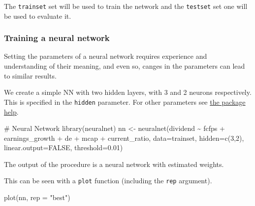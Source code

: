 \documentclass[
  letterpaper,
  DIV=11,
  numbers=noendperiod,
  oneside]{scrartcl}
\newenvironment{Shaded}{\begin{snugshade}}{\end{snugshade}}
\newcommand{\AttributeTok}[1]{\textcolor[rgb]{0.40,0.45,0.13}{#1}}
\newcommand{\CommentTok}[1]{\textcolor[rgb]{0.37,0.37,0.37}{#1}}
\newcommand{\ConstantTok}[1]{\textcolor[rgb]{0.56,0.35,0.01}{#1}}
\newcommand{\DecValTok}[1]{\textcolor[rgb]{0.68,0.00,0.00}{#1}}
\newcommand{\FloatTok}[1]{\textcolor[rgb]{0.68,0.00,0.00}{#1}}
\newcommand{\FunctionTok}[1]{\textcolor[rgb]{0.28,0.35,0.67}{#1}}
\newcommand{\NormalTok}[1]{\textcolor[rgb]{0.00,0.23,0.31}{#1}}
\newcommand{\OtherTok}[1]{\textcolor[rgb]{0.00,0.23,0.31}{#1}}
\newcommand{\SpecialCharTok}[1]{\textcolor[rgb]{0.37,0.37,0.37}{#1}}
\newcommand{\StringTok}[1]{\textcolor[rgb]{0.13,0.47,0.30}{#1}}
\begin{document}
The \texttt{trainset} set will be used to train the network and the
\texttt{testset} set one will be used to evaluate it.

\hypertarget{training-a-neural-network}{%
\subsubsection{Training a neural
network}\label{training-a-neural-network}}

Setting the parameters of a neural network requires experience and
understanding of their meaning, and even so, canges in the parameters
can lead to similar results.

We create a simple NN with two hidden layers, with 3 and 2 neurons
respectively. This is specified in the \texttt{hidden} parameter. For
other parameters see
\href{https://www.rdocumentation.org/packages/neuralnet/versions/1.44.2/topics/neuralnet}{the
package help}.

\begin{Shaded}
\begin{Highlighting}[]
\CommentTok{\# Neural Network}
\FunctionTok{library}\NormalTok{(neuralnet)}
\NormalTok{nn }\OtherTok{\textless{}{-}} \FunctionTok{neuralnet}\NormalTok{(dividend }\SpecialCharTok{\textasciitilde{}}\NormalTok{ fcfps }\SpecialCharTok{+}\NormalTok{ earnings\_growth }\SpecialCharTok{+}\NormalTok{ de }\SpecialCharTok{+}\NormalTok{ mcap }\SpecialCharTok{+}\NormalTok{ current\_ratio, }
                \AttributeTok{data=}\NormalTok{trainset, }
                \AttributeTok{hidden=}\FunctionTok{c}\NormalTok{(}\DecValTok{3}\NormalTok{,}\DecValTok{2}\NormalTok{), }
                \AttributeTok{linear.output=}\ConstantTok{FALSE}\NormalTok{, }
                \AttributeTok{threshold=}\FloatTok{0.01}\NormalTok{)}
\end{Highlighting}
\end{Shaded}

The output of the procedure is a neural network with estimated weights.

This can be seen with a \texttt{plot} function (including the
\texttt{rep} argument).

\begin{Shaded}
\begin{Highlighting}[]
\FunctionTok{plot}\NormalTok{(nn, }\AttributeTok{rep =} \StringTok{"best"}\NormalTok{)}
\end{Highlighting}
\end{Shaded}
\end{document}
